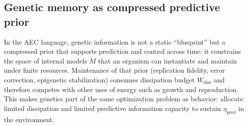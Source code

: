 \subsection{Genetic memory as compressed predictive prior}
\label{sec:genetic_prior}

In the AEC language, genetic information is not a static ``blueprint'' but a compressed prior that supports prediction and control across time:
it constrains the space of internal models $M$ that an organism can instantiate and maintain under finite resources.
Maintenance of that prior (replication fidelity, error correction, epigenetic stabilization) consumes dissipation budget $\dot W_{\mathrm{diss}}$ and therefore competes with other uses of energy such as growth and reproduction.
This makes genetics part of the same optimization problem as behavior: allocate limited dissipation and limited predictive information capacity to sustain $\eta_{\mathrm{pred}}$ in the environment.


